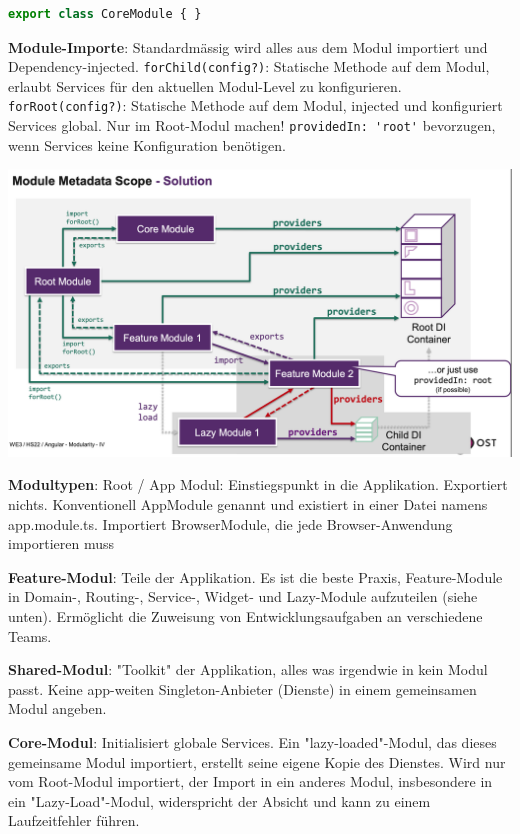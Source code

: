 \documentclass[10pt,landscape]{article}
\begin{document}
\begin{multicols}{2}
\begin{lstlisting}[language=JavaScript]
        export class CoreModule { }
        \end{lstlisting}

        \textbf{Module-Importe}: Standardmässig wird alles aus dem Modul importiert und Dependency-injected.
        \lstinline{forChild(config?)}: Statische Methode auf dem Modul, erlaubt Services für den aktuellen Modul-Level zu konfigurieren.
        \lstinline{forRoot(config?)}: Statische Methode auf dem Modul, injected und konfiguriert Services global.
        Nur im Root-Modul machen!
        \lstinline{providedIn: 'root'} bevorzugen, wenn Services keine Konfiguration benötigen.

        \includegraphics[width=\linewidth]{angular_module_big_picture}

        \textbf{Modultypen}: Root / App Modul: Einstiegspunkt in die Applikation.
        Exportiert nichts.
        Konventionell AppModule genannt und existiert in einer Datei namens app.module.ts.
        Importiert BrowserModule, die jede Browser-Anwendung importieren muss

        \textbf{Feature-Modul}: Teile der Applikation.
        Es ist die beste Praxis, Feature-Module in Domain-, Routing-, Service-, Widget- und Lazy-Module aufzuteilen (siehe unten).
        Ermöglicht die Zuweisung von Entwicklungsaufgaben an verschiedene Teams.

        \textbf{Shared-Modul}: "Toolkit" der Applikation, alles was irgendwie in kein Modul passt.
        Keine app-weiten Singleton-Anbieter (Dienste) in einem gemeinsamen Modul angeben.

        \textbf{Core-Modul}: Initialisiert globale Services.
        Ein "lazy-loaded"-Modul, das dieses gemeinsame Modul importiert, erstellt seine eigene Kopie des Dienstes.
        Wird nur vom Root-Modul importiert, der Import in ein anderes Modul, insbesondere in ein "Lazy-Load"-Modul, widerspricht der Absicht und kann zu einem Laufzeitfehler führen.


\end{multicols}
\end{document}
